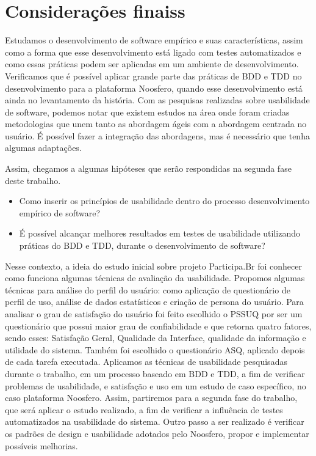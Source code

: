 \section{Considerações finaiss}
\label{sec:consideracoes-finais}
Estudamos o desenvolvimento de software empírico e suas características, assim como a forma que esse desenvolvimento está ligado com testes automatizados e como essas práticas podem ser aplicadas em um ambiente de desenvolvimento.
%
Verificamos que é possível aplicar grande parte das práticas de BDD e TDD no desenvolvimento para a plataforma Noosfero, quando esse desenvolvimento está ainda no levantamento da história.
%
Com as pesquisas realizadas sobre usabilidade de software, podemos notar que existem estudos na área onde foram criadas metodologias que unem tanto as abordagem ágeis com a abordagem centrada no usuário. É possível fazer a integração das abordagens, mas é necessário que tenha algumas adaptações.

Assim, chegamos a algumas hipóteses que serão respondidas na segunda fase deste trabalho.

\begin{itemize}
\item Como inserir os princípios de usabilidade dentro do processo desenvolvimento empírico de software?
\item É possível alcançar melhores resultados em testes de usabilidade utilizando práticas do BDD e TDD, durante o desenvolvimento de software?
\end{itemize}

Nesse contexto, a ideia do estudo inicial sobre projeto Participa.Br foi conhecer como funciona algumas técnicas de avaliação da usabilidade.
%
Propomos algumas técnicas para análise do perfil do usuário: como aplicação de questionário de perfil de uso, análise de dados estatísticos e criação de persona do usuário.
%
Para analisar o grau de satisfação do usuário foi feito escolhido o PSSUQ por ser um questionário que possui maior grau de confiabilidade e que retorna quatro fatores, sendo esses: Satisfação Geral, Qualidade da Interface, qualidade da informação e utilidade do sistema.
%
Também foi escolhido o questionário ASQ, aplicado depois de cada tarefa executada.
%
Aplicamos as técnicas de usabilidade pesquisadas durante o trabalho, em um processo baseado em BDD e TDD, a fim de verificar problemas de usabilidade, e satisfação e uso em um estudo de caso específico, no caso plataforma Noosfero. 
%
Assim, partiremos para a segunda fase do trabalho, que será aplicar o estudo realizado, a fim de verificar a influência de testes automatizados na usabilidade do sistema. Outro passo a ser realizado é verificar os padrões de design e usabilidade adotados pelo Noosfero, propor e implementar possíveis melhorias.


